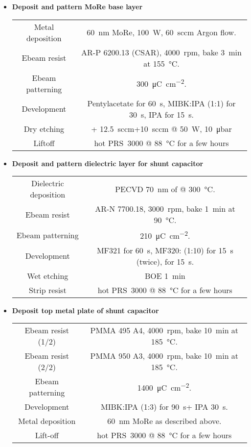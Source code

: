 \begin{itemize}
	\item \textbf{Deposit and pattern MoRe base layer}
	
	\begin{tabular}{cc}
		\hline
		Metal deposition & \SI{60}{\nano\meter} MoRe, \SI{100}{\watt}, \SI{60}{sccm} Argon flow. \\
		Ebeam resist & AR-P 6200.13 (CSAR), \SI{4000}{rpm}, bake \SI{3}{\minute} at \SI{155}{\celsius}. \\
		Ebeam patterning & \SI{300}{\micro\coulomb\per\centi\meter\squared}. \\
		Development & Pentylacetate for \SI{60}{\second}, MIBK:IPA (1:1) for \SI{30}{\second}, IPA for \SI{15}{\second}. \\
		Dry etching & \ce{SF6}+\ce{He} \SI{12.5}{sccm}+\SI{10}{sccm} @ \SI{50}{\watt}, \SI{10}{\micro\bar} \\
		Liftoff & hot PRS~3000 @ \SI{88}{\celsius} for a few hours \\
		\hline
	\end{tabular}
	\item \textbf{Deposit and pattern dielectric layer for shunt capacitor}
	
	\begin{tabular}{cc}
		\hline
		Dielectric deposition & PECVD \SI{70}{\nano\meter} of \ce{Si3N4} @ \SI{300}{\celsius}. \\
		Ebeam resist & AR-N 7700.18, \SI{3000}{rpm}, bake \SI{1}{\minute} at \SI{90}{\celsius}. \\
		Ebeam patterning & \SI{210}{\micro\coulomb\per\centi\meter\squared}. \\
		Development & MF321 for \SI{60}{\second}, MF320:\ce{H2O} (1:10) for \SI{15}{\second} (twice), \ce{H2O} for \SI{15}{\second}. \\
		Wet etching & BOE \SI{1}{\minute} \\
		Strip resist & hot PRS~3000 @ \SI{88}{\celsius} for a few hours \\
		\hline
	\end{tabular}
	\item \textbf{Deposit top metal plate of shunt capacitor}
	
	\begin{tabular}{cc}
		\hline
		Ebeam resist (1/2) & PMMA 495 A4, \SI{4000}{rpm}, bake \SI{10}{\minute} at \SI{185}{\celsius}. \\
		Ebeam resist (2/2) & PMMA 950 A3, \SI{4000}{rpm}, bake \SI{10}{\minute} at \SI{185}{\celsius}. \\
		Ebeam patterning & \SI{1400}{\micro\coulomb\per\centi\meter\squared}. \\
		Development & MIBK:IPA (1:3) for \SI{90}{\second}+ IPA \SI{30}{\second}. \\
		Metal deposition & \SI{60}{\nano\meter} MoRe as described above. \\
		Lift-off & hot PRS~3000 @ \SI{88}{\celsius} for a few hours \\
		\hline
	\end{tabular}
\end{itemize}
